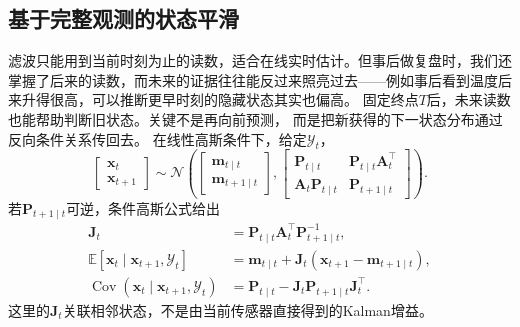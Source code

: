 \subsection{基于完整观测的状态平滑}
滤波只能用到当前时刻为止的读数，适合在线实时估计。但事后做复盘时，我们还掌握了后来的读数，而未来的证据往往能反过来照亮过去——例如事后看到温度后来升得很高，可以推断更早时刻的隐藏状态其实也偏高。
固定终点$T$后，未来读数也能帮助判断旧状态。关键不是再向前预测，
而是把新获得的下一状态分布通过反向条件关系传回去。
在线性高斯条件下，给定$\mathcal Y_t$，
\[
 \begin{bmatrix}\bm x_t\\\bm x_{t+1}\end{bmatrix}
 \sim\mathcal N\left(
 \begin{bmatrix}\bm m_{t\mid t}\\\bm m_{t+1\mid t}\end{bmatrix},
 \begin{bmatrix}
  \bm P_{t\mid t}&\bm P_{t\mid t}\bm A_t^\top\\
  \bm A_t\bm P_{t\mid t}&\bm P_{t+1\mid t}
 \end{bmatrix}\right).
\]
若$\bm P_{t+1\mid t}$可逆，条件高斯公式给出
\begin{align}
 \bm J_t&=\bm P_{t\mid t}\bm A_t^\top\bm P_{t+1\mid t}^{-1},
    \label{eq:dynamical-rts-gain}\\
 \mathbb E[\bm x_t\mid\bm x_{t+1},\mathcal Y_t]
   &=\bm m_{t\mid t}+\bm J_t(\bm x_{t+1}-\bm m_{t+1\mid t}),
    \label{eq:dynamical-rts-one-step-conditional-mean}\\
 \operatorname{Cov}(\bm x_t\mid\bm x_{t+1},\mathcal Y_t)
   &=\bm P_{t\mid t}-\bm J_t\bm P_{t+1\mid t}\bm J_t^\top.
    \label{eq:dynamical-rts-one-step-conditional-covariance}
\end{align}
这里的$\bm J_t$关联相邻状态，不是由当前传感器直接得到的Kalman增益。

